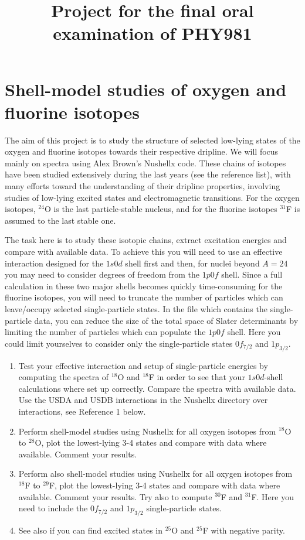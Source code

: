 \documentclass[prc]{revtex4}
\begin{document}
\title{Project for the final oral examination of PHY981}
\maketitle
\section*{Shell-model studies of oxygen and fluorine isotopes}

The aim of this project is to study the structure of selected low-lying states of the oxygen and fluorine isotopes towards their respective dripline. We will focus mainly on spectra   using Alex Brown's Nushellx code. 
These chains of  isotopes have been studied extensively during the last years (see the reference list), 
with many efforts toward the understanding of their dripline 
properties, involving studies of low-lying excited states and electromagnetic transitions. For the oxygen isotopes, 
$^{24}$O is the last particle-stable nucleus, and for the fluorine isotopes $^{31}$F  is assumed to the last stable one. 

The task here is to study these isotopic chains, extract excitation energies and compare with available data. To achieve this you will need to use an effective interaction designed for the $1s0d$ shell first
and then, for nuclei beyond $A=24$ you may need to consider degrees of freedom from the $1p0f$ shell. Since a full calculation in these two 
major shells becomes quickly time-consuming for the fluorine isotopes, you will need to truncate the number of particles which can leave/occupy selected single-particle states. In the file which contains the single-particle data, you can reduce the size of the total space of Slater determinants by limiting the number of particles which can populate 
the $1p0f$ shell. Here you could limit yourselves to consider only the single-particle states $0f_{7/2}$ and $1p_{3/2}$.


\begin{enumerate}
\item Test your effective interaction and setup of single-particle energies by computing the spectra of $^{18}$O and $^{18}$F in order to see that your $1s0d$-shell calculations where set up correctly.  Compare the spectra with available data.
Use the USDA and USDB interactions in the Nushellx directory over interactions, see Reference 1 below.
\item Perform shell-model studies using Nushellx for all oxygen isotopes from $^{18}$O to $^{28}$O, plot the lowest-lying 3-4 states and compare with data where available. Comment your results. 
\item Perform also shell-model studies using Nushellx for all oxygen isotopes from $^{18}$F to $^{29}$F, plot the lowest-lying 3-4 states and compare with data where available. Comment your results. Try also to compute $^{30}$F and $^{31}$F. Here you need to include the $0f_{7/2}$ and $1p_{3/2}$ single-particle states. 
\item See also if you can find  excited states in $^{25}$O and $^{25}$F  with negative parity.

\end{enumerate}
\end{document}
